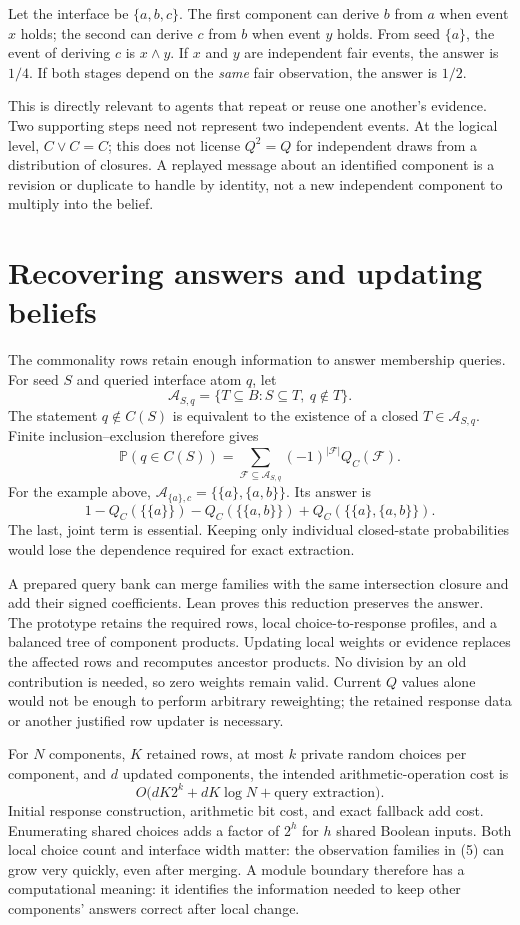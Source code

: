 \documentclass[11pt,a4paper]{article}
\newcommand{\Prob}{\mathbb P}
\begin{document}
Let the interface be $\{a,b,c\}$. The first component can derive $b$ from $a$
when event $x$ holds; the second can derive $c$ from $b$ when event $y$ holds.
From seed $\{a\}$, the event of deriving $c$ is $x\land y$. If $x$ and $y$ are
independent fair events, the answer is $1/4$. If both stages depend on the
\emph{same} fair observation, the answer is $1/2$.

This is directly relevant to agents that repeat or reuse one another's
evidence. Two supporting steps need not represent two independent events.
At the logical level, $C\vee C=C$; this does not license $Q^2=Q$ for independent
draws from a distribution of closures. A replayed message about an identified
component is a revision or duplicate to handle by identity, not a new
independent component to multiply into the belief.

\section{Recovering answers and updating beliefs}

The commonality rows retain enough information to answer membership queries.
For seed $S$ and queried interface atom $q$, let
\[
 \mathcal A_{S,q}=\{T\subseteq B:S\subseteq T,\ q\notin T\}.
\]
The statement $q\notin C(S)$ is equivalent to the existence of a closed
$T\in\mathcal A_{S,q}$. Finite inclusion--exclusion therefore gives
\[
 \Prob(q\in C(S))=
 \sum_{\mathcal F\subseteq\mathcal A_{S,q}}
       (-1)^{|\mathcal F|}Q_C(\mathcal F).
 \tag{5}
\]
For the example above, $\mathcal A_{\{a\},c}=\{\{a\},\{a,b\}\}$. Its answer is
\[
 1-Q_C(\{\{a\}\})-Q_C(\{\{a,b\}\})
      +Q_C(\{\{a\},\{a,b\}\}).
\]
The last, joint term is essential. Keeping only individual closed-state
probabilities would lose the dependence required for exact extraction.

A prepared query bank can merge families with the same intersection closure
and add their signed coefficients. Lean proves this reduction preserves the
answer. The prototype retains the required rows, local choice-to-response
profiles, and a balanced tree of component products. Updating local weights
or evidence replaces the affected rows and recomputes ancestor products.
No division by an old contribution is needed, so zero weights remain valid.
Current $Q$ values alone would not be enough to perform arbitrary reweighting;
the retained response data or another justified row updater is necessary.

For $N$ components, $K$ retained rows, at most $k$ private random choices per
component, and $d$ updated components, the intended arithmetic-operation cost is
\[
 O\bigl(dK2^k+dK\log N+\text{query extraction}\bigr).
\]
Initial response construction, arithmetic bit cost, and exact fallback add
cost. Enumerating shared choices adds a factor of $2^h$ for $h$ shared Boolean
inputs. Both local choice count and interface width matter: the observation
families in (5) can grow very quickly, even after merging.
A module boundary therefore has a computational meaning: it identifies the
information needed to keep other components' answers correct after local change.
\end{document}
